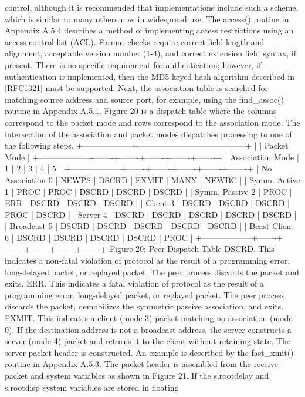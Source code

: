  control, although it is recommended that implementations include such
 a scheme, which is similar to many others now in widespread use. The
 access() routine in Appendix A.5.4 describes a method of implementing
 access restrictions using an access control list (ACL). Format
 checks require correct field length and alignment, acceptable version
 number (1-4), and correct extension field syntax, if present.
 There is no specific requirement for authentication; however, if
 authentication is implemented, then the MD5-keyed hash algorithm
 described in [RFC1321] must be supported.
 Next, the association table is searched for matching source address
 and source port, for example, using the find_assoc() routine in
 Appendix A.5.1. Figure 20 is a dispatch table where the columns
 correspond to the packet mode and rows correspond to the association
 mode. The intersection of the association and packet modes
 dispatches processing to one of the following steps.
 +------------------+---------------------------------------+
 | | Packet Mode |
 +------------------+-------+-------+-------+-------+-------+
 | Association Mode | 1 | 2 | 3 | 4 | 5 |
 +------------------+-------+-------+-------+-------+-------+
 | No Association 0 | NEWPS | DSCRD | FXMIT | MANY | NEWBC |
 | Symm. Active 1 | PROC | PROC | DSCRD | DSCRD | DSCRD |
 | Symm. Passive 2 | PROC | ERR | DSCRD | DSCRD | DSCRD |
 | Client 3 | DSCRD | DSCRD | DSCRD | PROC | DSCRD |
 | Server 4 | DSCRD | DSCRD | DSCRD | DSCRD | DSCRD |
 | Broadcast 5 | DSCRD | DSCRD | DSCRD | DSCRD | DSCRD |
 | Bcast Client 6 | DSCRD | DSCRD | DSCRD | DSCRD | PROC |
 +------------------+-------+-------+-------+-------+-------+
 Figure 20: Peer Dispatch Table
 DSCRD. This indicates a non-fatal violation of protocol as the
 result of a programming error, long-delayed packet, or replayed
 packet. The peer process discards the packet and exits.
ERR. This indicates a fatal violation of protocol as the result of a
 programming error, long-delayed packet, or replayed packet. The peer
 process discards the packet, demobilizes the symmetric passive
 association, and exits.
 FXMIT. This indicates a client (mode 3) packet matching no
 association (mode 0). If the destination address is not a broadcast
 address, the server constructs a server (mode 4) packet and returns
 it to the client without retaining state. The server packet header
 is constructed. An example is described by the fast_xmit() routine
 in Appendix A.5.3. The packet header is assembled from the receive
 packet and system variables as shown in Figure 21. If the
 s.rootdelay and s.rootdisp system variables are stored in floating
